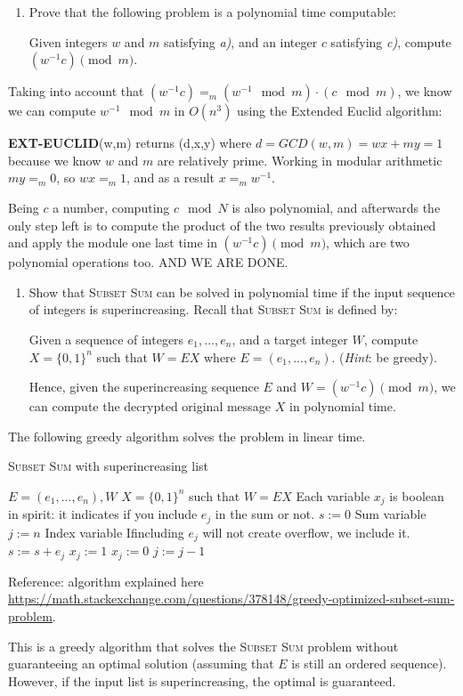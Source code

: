 \documentclass[a4paper]{article}
\begin{document}
\begin{enumerate}[resume, label=\roman*)]
	\item Prove that the following problem is a polynomial time computable:
	
	Given integers $w$ and $m$ satisfying \emph{a)}, and an integer $c$ satisfying \emph{c)}, compute $(w^{-1}c) \pmod{m}$.
\end{enumerate}
Taking into account that $(w^{-1}c)=_m(w^{-1}\mod{m})·(c \mod{m})$, we know we can compute $w^{-1}\mod{m}$ in $O(n^3)$ using the Extended Euclid algorithm:

 \textbf{EXT-EUCLID}(w,m) returns (d,x,y) where $d=GCD(w,m)=wx + my=1$ because we know $w$ and $m$ are relatively prime. Working in modular arithmetic $my=_m0$, so $wx=_m 1$, and as a result $x=_m w^{-1}$.
 
 Being $c$ a number, computing $c \mod{N}$ is also polynomial, and afterwards the only step left is to compute the product of the two results previously obtained and apply the module one last time in $(w^{-1}c) \pmod{m}$, which are two polynomial operations too. AND WE ARE DONE.

\begin{enumerate}[resume, label=\roman*)]
	\item Show that \textsc{Subset Sum} can be solved in polynomial time if the input sequence of integers is superincreasing. Recall that \textsc{Subset Sum} is defined by:
	
	Given a sequence of integers $e_1, ..., e_n$, and a target integer $W$, compute $X = \{0, 1\}^n$ such that $W = EX$ where $E = (e_1, ..., e_n)$. (\emph{Hint}: be greedy).
	
	Hence, given the superincreasing sequence $E$ and $W = (w^{-1}c) \pmod{m}$, we can compute the decrypted original message $X$ in polynomial time.
\end{enumerate}

The following greedy algorithm solves the problem in linear time.

\begin{algorithm}[H]
	\caption{\textsc{Subset Sum} with superincreasing list}
\begin{algorithmic}
	\INPUT $E= (e_1, ... , e_n), W $
	\OUTPUT $ X = \{0,1\}^n $ such that $W=EX$
	\State \Comment Each variable $x_j$ is boolean in spirit: it indicates if you include $e_j$ in the sum or not.
	\State $s := 0$ \Comment Sum variable
	\State $j := n$ \Comment Index variable
		 \Comment Ifincluding  $e_j$ will not create overflow, we include it.
			\State $s := s + e_j$
			\State $x_j := 1$
		\Else
			\State $x_j := 0$
		\EndIf
		$ j := j-1 $
	\EndWhile
\end{algorithmic}
\end{algorithm}

Reference: algorithm explained here \rightarrow \url{https://math.stackexchange.com/questions/378148/greedy-optimized-subset-sum-problem}.

This is a greedy algorithm that solves the \textsc{Subset Sum} problem without guaranteeing an optimal solution (assuming that $E$ is still an ordered sequence). However, if the input list is superincreasing, the optimal is guaranteed.
\end{document}
